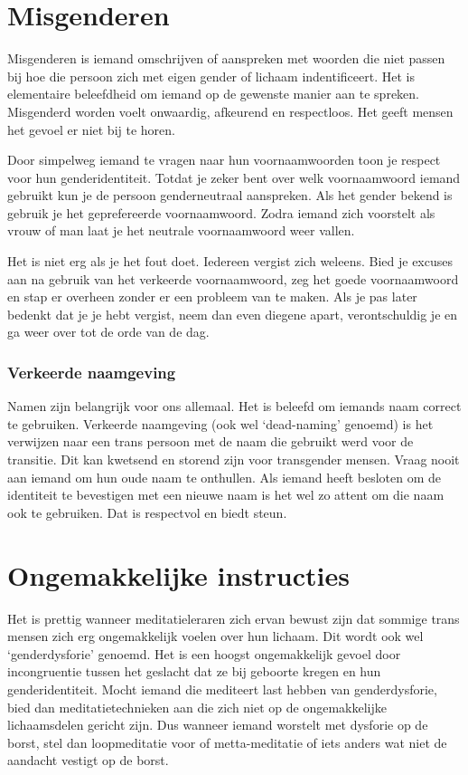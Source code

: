 \documentclass[12pt,openany]{book}
\begin{document}
\section*{Misgenderen}

Misgenderen is iemand omschrijven of aanspreken met woorden die niet passen bij hoe die persoon zich met eigen gender of lichaam indentificeert. 
Het is elementaire beleefdheid om iemand op de gewenste manier aan te spreken. Misgenderd worden voelt onwaardig, afkeurend en respectloos. Het geeft mensen het gevoel er niet bij te horen. 

Door simpelweg iemand te vragen naar hun voornaamwoorden toon je respect voor hun genderidentiteit. Totdat je zeker bent over welk voornaamwoord iemand gebruikt kun je de persoon genderneutraal aanspreken. Als het gender bekend is gebruik je het geprefereerde voornaamwoord. Zodra iemand zich voorstelt als vrouw of man laat je het neutrale voornaamwoord weer vallen.

	Het is niet erg als je het fout doet. Iedereen vergist zich weleens. Bied je excuses aan na gebruik van het verkeerde voornaamwoord, zeg het goede voornaamwoord en stap er overheen zonder er een probleem van te maken. Als je pas later bedenkt dat je je hebt vergist, neem dan even diegene apart, verontschuldig je en ga weer over tot de orde van de dag.

\subsubsection*{Verkeerde naamgeving}

Namen zijn belangrijk voor ons allemaal. Het is beleefd om iemands naam correct te gebruiken. Verkeerde naamgeving (ook wel ‘dead-naming’ genoemd) is het verwijzen naar een trans persoon met de naam die gebruikt werd voor de transitie. Dit kan kwetsend en storend zijn voor transgender mensen. Vraag nooit aan iemand om hun oude naam te onthullen. Als iemand heeft besloten om de identiteit te bevestigen met een nieuwe naam is het wel zo attent om die naam ook te gebruiken. Dat is respectvol en biedt steun. 

\section*{Ongemakkelijke instructies}

Het is prettig wanneer meditatieleraren zich ervan bewust zijn dat sommige trans mensen zich erg ongemakkelijk voelen over hun lichaam. Dit wordt ook wel ‘genderdysforie’ genoemd. Het is een hoogst ongemakkelijk gevoel door incongruentie tussen het geslacht dat ze bij geboorte kregen en hun genderidentiteit. Mocht iemand die mediteert last hebben van genderdysforie, bied dan meditatietechnieken aan die zich niet op de ongemakkelijke lichaamsdelen gericht zijn. Dus wanneer iemand worstelt met dysforie op de borst, stel dan loopmeditatie voor of metta-meditatie of iets anders wat niet de aandacht vestigt op de borst.
\end{document}
